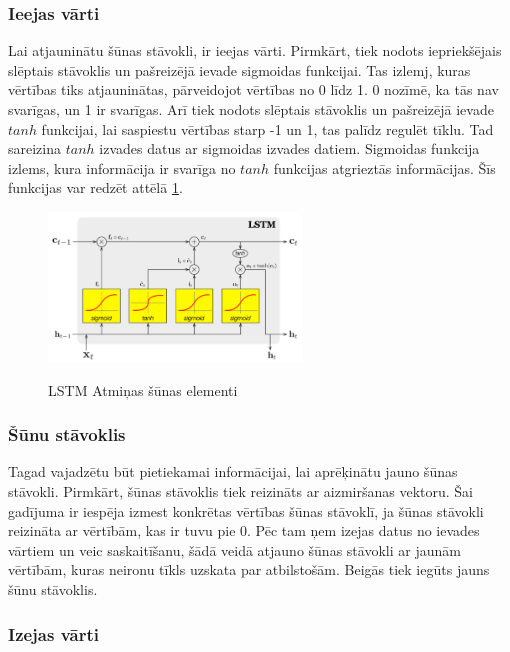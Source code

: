 \documentclass[12pt,paper=A4]{report}
\begin{document}
\subsubsection{Ieejas vārti}


Lai atjauninātu šūnas stāvokli, ir ieejas vārti. Pirmkārt, tiek nodots iepriekšējais slēptais stāvoklis un pašreizējā ievade sigmoidas funkcijai. Tas izlemj, kuras vērtības tiks atjauninātas, pārveidojot vērtības no 0 līdz 1. 0 nozīmē, ka tās nav svarīgas, un 1 ir svarīgas. Arī tiek nodots slēptais stāvoklis un pašreizējā ievade $tanh$ funkcijai, lai saspiestu vērtības starp -1 un 1, tas palīdz regulēt tīklu. Tad sareizina $tanh$ izvades datus ar sigmoidas izvades datiem. Sigmoidas funkcija izlems, kura informācija ir svarīga no $tanh$ funkcijas atgrieztās informācijas. Šīs funkcijas var redzēt attēlā \ref{lstmActivation}.

\begin{figure}[H] \centering
\includegraphics[width=0.60\textwidth]{lstmActivation} 
\caption{LSTM Atmiņas šūnas elementi}
\cite{https://medium.com/@kangeugine/long-short-term-memory-lstm-concept-cb3283934359}
  \label{lstmActivation} 
\end{figure}


\subsubsection{Šūnu stāvoklis}

Tagad vajadzētu būt pietiekamai informācijai, lai aprēķinātu jauno šūnas stāvokli. Pirmkārt, šūnas stāvoklis tiek reizināts ar aizmiršanas vektoru. Šai gadījuma ir iespēja izmest konkrētas vērtības šūnas stāvoklī, ja šūnas stāvokli reizināta ar vērtībām, kas ir tuvu pie 0. Pēc tam ņem izejas datus no ievades vārtiem un veic saskaitīšanu, šādā veidā atjauno šūnas stāvokli ar jaunām vērtībām, kuras neironu tīkls uzskata par atbilstošām. Beigās tiek iegūts jauns šūnu stāvoklis.

\subsubsection{Izejas vārti}
\end{document}
